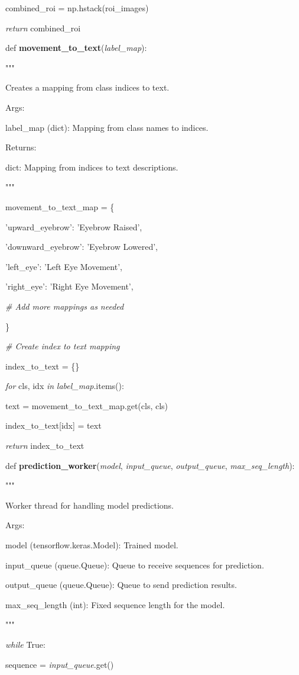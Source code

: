 \documentclass[
]{article}
\begin{document}
combined\_roi = np.hstack(roi\_images)

\emph{return} combined\_roi

def \textbf{movement\_to\_text}(\emph{label\_map}):

"""

Creates a mapping from class indices to text.

Args:

label\_map (dict): Mapping from class names to indices.

Returns:

dict: Mapping from indices to text descriptions.

"""

movement\_to\_text\_map = \{

'upward\_eyebrow': 'Eyebrow Raised',

'downward\_eyebrow': 'Eyebrow Lowered',

'left\_eye': 'Left Eye Movement',

'right\_eye': 'Right Eye Movement',

\emph{\# Add more mappings as needed}

\}

\emph{\# Create index to text mapping}

index\_to\_text = \{\}

\emph{for} cls, idx \emph{in} \emph{label\_map}.items():

text = movement\_to\_text\_map.get(cls, cls)

index\_to\_text{[}idx{]} = text

\emph{return} index\_to\_text

def \textbf{prediction\_worker}(\emph{model}, \emph{input\_queue}, \emph{output\_queue}, \emph{max\_seq\_length}):

"""

Worker thread for handling model predictions.

Args:

model (tensorflow.keras.Model): Trained model.

input\_queue (queue.Queue): Queue to receive sequences for prediction.

output\_queue (queue.Queue): Queue to send prediction results.

max\_seq\_length (int): Fixed sequence length for the model.

"""

\emph{while} True:

sequence = \emph{input\_queue}.get()
\end{document}

